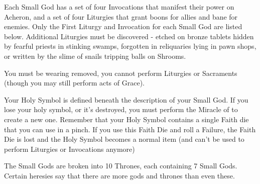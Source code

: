 {



\newpage


Each Small God has a set of four Invocations that manifest their power on Acheron, and a set of four Liturgies that grant boons for allies and bane for enemies.  Only the First Liturgy and Invocation for each Small God are listed below. Additional Liturgies must be discovered - etched on bronze tablets hidden by fearful priests in stinking swamps, forgotten in reliquaries lying in pawn shops, or written by the slime of snails tripping balls on Shrooms.



You must be wearing removed, you cannot perform Liturgies or Sacraments (though you may still perform acts of Grace).  

Your Holy Symbol is defined beneath the description of your Small God.  If you lose your holy symbol, or it's destroyed, you must perform the Miracle of  to create a new one.  Remember that your Holy Symbol contains a single Faith die that you can use in a pinch.  If you use this Faith Die and roll a Failure, the Faith Die is lost and the Holy Symbol becomes a normal item (and can't be used to perform Liturgies or Invocations anymore)

\newpage


The Small Gods are broken into 10 Thrones, each containing 7 Small Gods.  Certain heresies say that there are more gods and thrones than even these.





}

